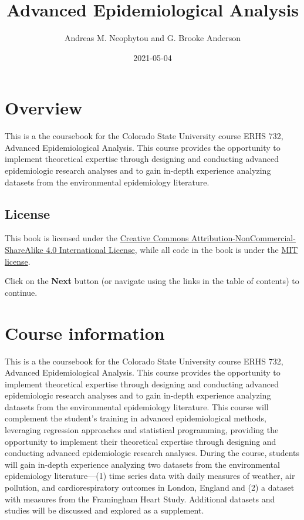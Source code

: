\documentclass[
]{book}
\title{Advanced Epidemiological Analysis}
\author{Andreas M. Neophytou and G. Brooke Anderson}
\date{2021-05-04}
\begin{document}
\maketitle

{
\setcounter{tocdepth}{1}
\tableofcontents
}
\hypertarget{overview}{%
\chapter{Overview}\label{overview}}

This is a the coursebook for the Colorado State University course ERHS 732,
Advanced Epidemiological Analysis. This course provides the opportunity to
implement theoretical expertise through designing and conducting advanced
epidemiologic research analyses and to gain in-depth experience analyzing
datasets from the environmental epidemiology literature.

\hypertarget{license}{%
\section{License}\label{license}}

This book is licensed under the \href{https://creativecommons.org/licenses/by-nc-sa/4.0/}{Creative Commons
Attribution-NonCommercial-ShareAlike 4.0 International
License}, while all code in
the book is under the \href{https://opensource.org/licenses/MIT}{MIT license}.

Click on the \textbf{Next} button (or navigate using the links in the table of
contents) to continue.

\hypertarget{courseinfo}{%
\chapter{Course information}\label{courseinfo}}

This is a the coursebook for the Colorado State University course ERHS 732,
Advanced Epidemiological Analysis. This course provides the opportunity to
implement theoretical expertise through designing and conducting advanced
epidemiologic research analyses and to gain in-depth experience analyzing
datasets from the environmental epidemiology literature. This course will
complement the student's training in advanced epidemiological methods,
leveraging regression approaches and statistical programming, providing the
opportunity to implement their theoretical expertise through designing and
conducting advanced epidemiologic research analyses. During the course,
students will gain in-depth experience analyzing two datasets from the
environmental epidemiology literature---(1) time series data with daily measures
of weather, air pollution, and cardiorespiratory outcomes in London, England and
(2) a dataset with measures from the Framingham Heart Study. Additional datasets
and studies will be discussed and explored as a supplement.
\end{document}
